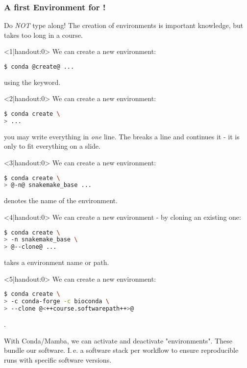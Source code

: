 \begin{frame}[fragile]
	\frametitle{A first Environment for \Snakemake!}
	\begin{warning}
		Do \emph{NOT} type along! The creation of environments is important knowledge, but takes too long in a course.
	\end{warning}
    \begin{onlyenv}<1|handout:0>
      We can create a new environment:
      \begin{lstlisting}[language=Bash, style=Shell]
$ conda @create@ ...
      \end{lstlisting}
      using the  keyword.
    \end{onlyenv}
    \begin{onlyenv}<2|handout:0>
    	We can create a new environment:
    	\begin{lstlisting}[language=Bash, style=Shell]
$ conda create \
> ...
    	\end{lstlisting}
    	you may write everything in \emph{one} line. The \altverb{\\} breaks a line and \altverb{>} continues it - it is only to fit everything on a slide.
    \end{onlyenv}
    \begin{onlyenv}<3|handout:0>
    	We can create a new environment:
    	\begin{lstlisting}[language=Bash, style=Shell]
$ conda create \
> @-n@ snakemake_base ...
    	\end{lstlisting}
    	 denotes the name of the environment.
    \end{onlyenv}
    \begin{onlyenv}<4|handout:0>
    	We can create a new environment - by cloning an existing one:
    	\begin{lstlisting}[language=Bash, style=Shell]
$ conda create \
> -n snakemake_base \
> @--clone@ ...
    	\end{lstlisting}
    	 takes a environment name or path.
    \end{onlyenv}
    \begin{onlyenv}<5|handout:0>
    	We can create a new environment:
    	\begin{lstlisting}[language=Bash, style=Shell]
$ conda create \
> -c conda-forge -c bioconda \
> --clone @<++course.softwarepath++>@
    	\end{lstlisting}
    	.
    \end{onlyenv}
    \vfill
    \begin{docs}[What is an \emph{Environment}?]
    	With Conda/Mamba, we can activate and deactivate "environments". These bundle our software. I.\,e. a software stack per workflow to ensure reproducible runs with specific software versions.
    \end{docs}
\end{frame}

